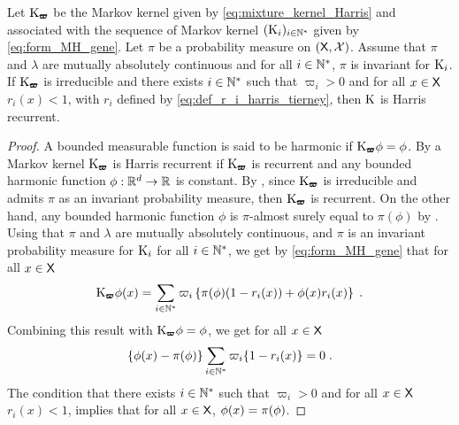 \begin{proposition}
  \label{propo:harris_rec}
  Let $\mathrm{K}_{\pmb{\varpi}}$ be the Markov kernel given by
  \eqref{eq:mixture_kernel_Harris} and associated with the sequence of
  Markov kernel $(\mathrm{K}_i)_{i \in \mathbb{N}^*}$ given by
  \eqref{eq:form_MH_gene}.  Let $\pi$ be a probability measure on
  $(\mathsf{X},\mathcal{X})$. Assume that $\pi$ and $\lambda$ are mutually
  absolutely continuous and for all $i \in \mathbb{N}^*$, $\pi$ is invariant for $\mathrm{K}_i$. If $\mathrm{K}_{\pmb{\varpi}}$ is irreducible and there exists $i \in \mathbb{N}^*$ such that $\varpi_i >0$ and for all $x \in \mathsf{X}$ $r_i(x) <1$, with $r_i$ defined by \eqref{eq:def_r_i_harris_tierney},  then $\mathrm{K}$ is Harris
  recurrent.
\end{proposition}

\begin{proof}
A bounded measurable function is said to be harmonic if  $\mathrm{K}_{\pmb{\varpi}}\phi = \phi$.
By \cite[Theorem 17.1.4, Theorem
17.1.7]{meyn:tweedie:2009} a Markov kernel $\mathrm{K}_{\pmb{\varpi}}$ is Harris recurrent if $\mathrm{K}_{\pmb{\varpi}}$ is recurrent and any
bounded harmonic function $\phi : \mathbb{R}^d \to \mathbb{R}$ is constant.
By \cite[Theorem 10.1.1]{meyn:tweedie:2009}, since $\mathrm{K}_{\pmb{\varpi}}$ is irreducible and admits $\pi$ as an invariant probability measure, then $\mathrm{K}_{\pmb{\varpi}}$ is recurrent.
On the other hand, any bounded harmonic function $\phi$ is $\pi$-almost surely equal to $\pi(\phi)$ by \cite[Theorem 17.1.1, Lemma 17.1.1]{meyn:tweedie:2009}.
Using that $\pi$ and $\lambda$ are mutually
absolutely continuous, and $\pi$ is an invariant probability measure for $\mathrm{K}_i$ for all $i \in \mathbb{N}^*$,  we get by \eqref{eq:form_MH_gene} that for all $x \in \mathsf{X}$
\begin{equation}
   \mathrm{K}_{\pmb{\varpi}} \phi(x) =  \sum_{i\in \mathbb{N}^*} \varpi_i \left\lbrace \pi(\phi) (1-r_i(x)) + \phi(x)r_i(x) \right\rbrace \;.
\end{equation}
Combining this result with $\mathrm{K}_{\pmb{\varpi}} \phi = \phi$, we get for all $x \in \mathsf{X}$
\begin{equation}
\{\phi(x)-\pi(\phi)\} \sum_{i\in \mathbb{N}^*} \varpi_i \{1-r_i(x)\}= 0\;.
\end{equation}
The condition that there exists $i \in \mathbb{N}^*$ such that $\varpi_i >0$ and for all $x \in \mathsf{X}$ $r_i(x) <1$, implies  that for all $x \in \mathsf{X}$, $\phi(x) = \pi(\phi)$.
\end{proof}
